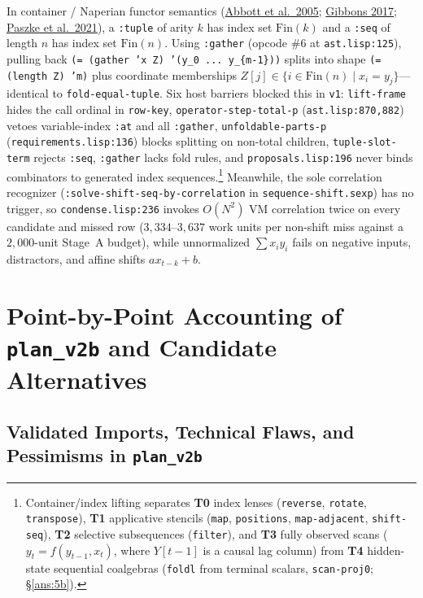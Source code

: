 \documentclass[12pt]{article}
\newcommand{\litref}[2]{\hyperlink{lit:#1}{\textcolor{citegreen}{#2}}}
\begin{document}
In container / Naperian functor semantics (\litref{abbott2005}{Abbott et al.\ 2005}; \litref{gibbons2017}{Gibbons 2017}; \litref{paszke2021}{Paszke et al.\ 2021}), a \texttt{:tuple} of arity $k$ has index set $\mathrm{Fin}(k)$ and a \texttt{:seq} of length $n$ has index set $\mathrm{Fin}(n)$. Using \texttt{:gather} (opcode $\#6$ at \texttt{ast.lisp:125}), pulling back \texttt{(= (gather 'x Z) '(y\_0 ... y\_\{m-1\}))} splits into shape \texttt{(= (length Z) 'm)} plus coordinate memberships $Z[j] \in \{i \in \mathrm{Fin}(n) \mid x_i = y_j\}$---identical to \texttt{fold-equal-tuple}. Six host barriers blocked this in \texttt{v1}: \texttt{lift-frame} hides the call ordinal in \texttt{row-key}, \texttt{operator-step-total-p} (\texttt{ast.lisp:870,882}) vetoes variable-index \texttt{:at} and all \texttt{:gather}, \texttt{unfoldable-parts-p} (\texttt{requirements.lisp:136}) blocks splitting on non-total children, \texttt{tuple-slot-term} rejects \texttt{:seq}, \texttt{:gather} lacks fold rules, and \texttt{proposals.lisp:196} never binds combinators to generated index sequences.\footnote{Container/index lifting separates \textbf{T0} index lenses (\texttt{reverse}, \texttt{rotate}, \texttt{transpose}), \textbf{T1} applicative stencils (\texttt{map}, \texttt{positions}, \texttt{map-adjacent}, \texttt{shift-seq}), \textbf{T2} selective subsequences (\texttt{filter}), and \textbf{T3} fully observed scans ($y_t = f(y_{t-1}, x_t)$, where $Y[t-1]$ is a causal lag column) from \textbf{T4} hidden-state sequential coalgebras (\texttt{foldl} from terminal scalars, \texttt{scan-proj0}; \S\ref{ans:5b}).} Meanwhile, the sole correlation recognizer (\texttt{:solve-shift-seq-by-correlation} in \texttt{sequence-shift.sexp}) has no trigger, so \texttt{condense.lisp:236} invokes $O(N^2)$ VM correlation twice on every candidate and missed row ($3,334$--$3,637$ work units per non-shift miss against a $2,000$-unit Stage~A budget), while unnormalized $\sum x_i y_i$ fails on negative inputs, distractors, and affine shifts $a x_{t-k} + b$.

\section{Point-by-Point Accounting of \texttt{plan\_v2b} and Candidate Alternatives}
\label{sec:accounting}

\subsection{Validated Imports, Technical Flaws, and Pessimisms in \texttt{plan\_v2b}}
\label{sec:v2b-accounting}
\end{document}
